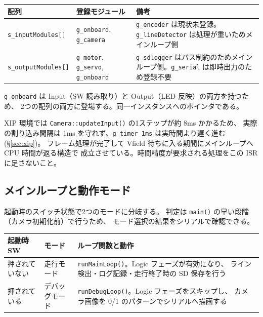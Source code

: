 \documentclass[a4paper,11pt,dvipdfmx]{jsarticle}
\begin{document}
\begin{tabularx}{\textwidth}{l l X}
\toprule
\textbf{配列} & \textbf{登録モジュール} & \textbf{備考} \\
\midrule
\texttt{s\_inputModules[]}  & \texttt{g\_onboard}, \texttt{g\_camera} &
  \texttt{g\_encoder} は現状未登録。\texttt{g\_lineDetector} は処理が重いためメインループ側 \\
\texttt{s\_outputModules[]} & \texttt{g\_motor}, \texttt{g\_servo}, \texttt{g\_onboard} &
  \texttt{g\_sdlogger} はバス制約のためメインループ側。\texttt{g\_serial} は即時出力のため登録不要 \\
\bottomrule
\end{tabularx}

\begin{notebox}
\texttt{g\_onboard} は Input（SW 読み取り）と Output（LED 反映）の両方を持つため、
2つの配列の両方に登場する。同一インスタンスへのポインタである。
\end{notebox}

\begin{cautionbox}[1ms を超える処理が入る]
XIP 環境では \texttt{Camera::updateInput()} の1ステップが約 8ms かかるため、
実際の割り込み間隔は 1ms を守れず、\texttt{g\_timer\_1ms} は実時間より遅く進む
(\hyperref[sec:xip]{§\ref*{sec:xip}})。
フレーム処理が完了して Vfield 待ちに入る期間にメインループへ CPU 時間が返る構造で
成立させている。時間精度が要求される処理をこの ISR に足さないこと。
\end{cautionbox}

\subsection{メインループと動作モード}\label{sec:mainloop}

起動時のスイッチ状態で2つのモードに分岐する。
判定は \texttt{main()} の早い段階（カメラ初期化前）で行うため、
モード選択の結果をシリアルで確認できる。

\begin{tabularx}{\textwidth}{l l X}
\toprule
\textbf{起動時 SW} & \textbf{モード} & \textbf{ループ関数と動作} \\
\midrule
押されていない & 走行モード     & \texttt{runMainLoop()}。Logic フェーズが有効になり、
  ライン検出・ログ記録・走行終了時の SD 保存を行う \\
押されている   & デバッグモード & \texttt{runDebugLoop()}。Logic フェーズをスキップし、
  カメラ画像を 0/1 のパターンでシリアルへ描画する \\
\bottomrule
\end{tabularx}
\end{document}
